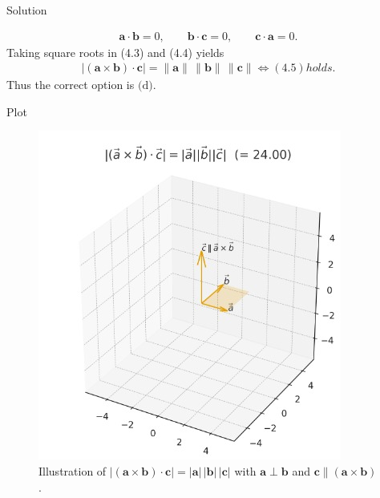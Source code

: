 \documentclass{beamer}
\theoremstyle{remark}
\providecommand{\abs}[1]{\left\vert#1\right\vert}
\let\vec\mathbf
\begin{document}
\begin{frame}{Solution}
 \begin{solution}
     
\begin{align}
\vec{a}\cdot\vec{b}=0,\qquad 
\vec{b}\cdot\vec{c}=0,\qquad 
\vec{c}\cdot\vec{a}=0 .
\label{eq:orth}
\end{align}
Taking square roots in (4.3) and (4.4) yields
\begin{align}
\abs{(\vec{a}\times\vec{b})\cdot\vec{c}}
= \|\vec{a}\|\,\|\vec{b}\|\,\|\vec{c}\|
\iff
(4.5)  holds.
\label{eq:final}
\end{align}
Thus the correct option is \(\boxed{\text{(d)}}\).
\end{solution}
\end{frame}
\begin{frame}{Plot}
     \begin{figure}[h!]
\centering
\includegraphics[width=0.5\linewidth]{figs/2.10.28.jpeg}
\caption{Illustration of $|( \vec a\times\vec b)\cdot\vec c|=|\vec a|\,|\vec b|\,|\vec c|$ with $\vec a\perp\vec b$ and $\vec c\parallel(\vec a\times\vec b)$.}


\end{figure}
\end{frame}
\end{document}
